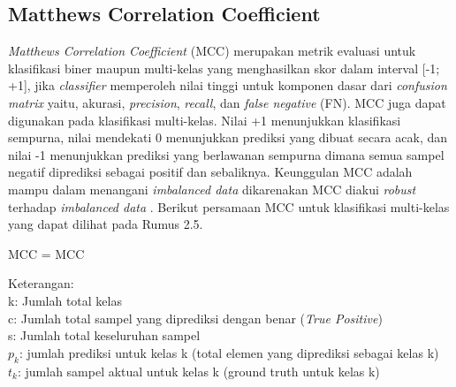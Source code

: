 \subsection{Matthews Correlation Coefficient} \label{II.Teori7}
\textit{Matthews Correlation Coefficient} (MCC) merupakan metrik evaluasi untuk 
klasifikasi biner maupun multi-kelas yang menghasilkan skor dalam interval [-1; +1], jika 
\textit{classifier} memperoleh nilai tinggi untuk komponen dasar dari 
\textit{confusion matrix} yaitu, akurasi, \textit{precision}, \textit{recall}, 
dan \textit{false negative} (FN). MCC juga dapat digunakan pada klasifikasi 
multi-kelas. Nilai +1 menunjukkan klasifikasi sempurna, nilai mendekati 0 
menunjukkan prediksi yang dibuat secara acak, dan nilai -1 menunjukkan 
prediksi yang berlawanan sempurna dimana semua sampel negatif diprediksi 
sebagai positif dan sebaliknya. Keunggulan MCC adalah mampu dalam menangani 
\textit{imbalanced data} dikarenakan MCC diakui \textit{robust} terhadap 
\textit{imbalanced data} \cite{chicco2023matthews}. Berikut persamaan MCC untuk klasifikasi multi-kelas 
yang dapat dilihat pada Rumus 2.5.
\begin{equationcaptioned}[eq:2.mcc]{
	MCC = 
}{
	MCC %
}
\end{equationcaptioned}


\noindent Keterangan: \\
k: Jumlah total kelas \\ 
c: Jumlah total sampel yang diprediksi dengan benar (\textit{True Positive}) \\
s: Jumlah total keseluruhan sampel \\
$p_k$: jumlah prediksi untuk kelas k (total elemen yang diprediksi sebagai kelas k) \\
$t_k$: jumlah sampel aktual untuk kelas k (ground truth untuk kelas k) \\

	
